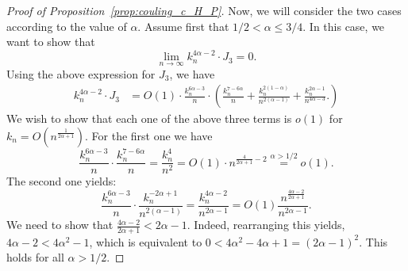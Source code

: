\begin{proof}[Proof of Proposition~\ref{prop:couling_c_H_P}]

Now, we will consider the two cases according to the value of $\alpha$. 
Assume first that $1/2 < \alpha \leq 3/4$. 
In this case, we want to show that 
\begin{equation} \label{eq:int3_to_prove_I}
\lim_{n \to \infty} k_n^{4\alpha -2} \cdot J_3 = 0. 
\end{equation}
Using the above expression for $J_3$, we have 
\begin{align*} 
 k_n^{4\alpha -2} \cdot J_3 &= O(1) \cdot  
 \frac{k_n^{6\alpha -3}}{n} \cdot 
\left( 
\frac{k_n^{7-6\alpha}}{n} + \frac{k_n^{2(1-\alpha)}}{n^{2(\alpha-1)}} 
+\frac{k_n^{2\alpha-1}}{n^{4\alpha - 3}}.
\right) 
\end{align*}
We wish to show that each one of the above three terms is $o(1)$ for $k_n = O(n^{\frac{1}{2\alpha +1}})$. 
For the first one we have 
$$ \frac{k_n^{6\alpha -3}}{n} \cdot \frac{k_n^{7-6\alpha}}{n} = \frac{k_n^{4}}{n^2} = O(1) \cdot n^{\frac{4}{2\alpha +1} -2} \stackrel{\alpha >1/2}{=} o(1). 
$$
The second one yields: 
$$ \frac{k_n^{6\alpha -3}}{n} \cdot  \frac{k_n^{-2\alpha+1}}{n^{2(\alpha-1)}} =\frac{k_n^{4\alpha -2}}{n^{2\alpha -1}} =O(1) \frac{n^{\frac{4\alpha -2}{2\alpha+1}}}{n^{2\alpha -1}}.$$
We need to show that $\frac{4\alpha -2}{2\alpha+1}< 2\alpha -1$. Indeed, rearranging this 
 yields, $4\alpha -2 < 4\alpha^2 -1$, which is equivalent to $0< 4\alpha^2 - 4\alpha +1=(2\alpha- 1)^2$. This holds for all $\alpha >1/2$.  
 

\end{proof}
